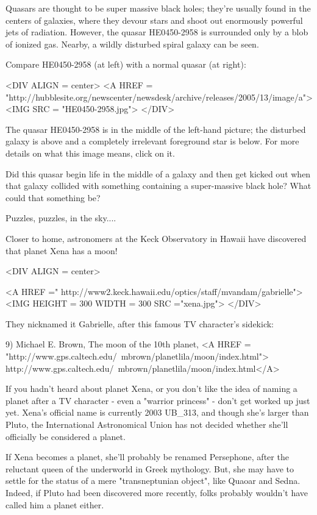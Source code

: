 Quasars are thought to be super massive black holes; they're usually 
found in the centers of galaxies, where they devour stars and shoot 
out enormously powerful jets of radiation.  However, the quasar 
HE0450-2958 is surrounded only by a blob of ionized gas.  Nearby, a
wildly disturbed spiral galaxy can be seen.  

Compare HE0450-2958 (at left) with a normal quasar (at right):

<DIV ALIGN = center>
<A HREF = "http://hubblesite.org/newscenter/newsdesk/archive/releases/2005/13/image/a">
<IMG SRC = 
"HE0450-2958.jpg">
</DIV>

The quasar HE0450-2958 is in the middle of the left-hand picture;
the disturbed galaxy is above and a completely irrelevant foreground
star is below.  For more details on what this image means, click on it.

Did this quasar begin 
life in the middle of a galaxy and then get kicked out when that 
galaxy collided 
with something containing a super-massive black hole?  What could that
something be?

Puzzles, puzzles, in the sky....

Closer to home, astronomers at the Keck Observatory in Hawaii have 
discovered that planet Xena has a moon! 

<DIV ALIGN = center>

<A HREF =" http://www2.keck.hawaii.edu/optics/staff/mvandam/gabrielle">
<IMG HEIGHT = 300 WIDTH = 300 SRC ="xena.jpg">
</DIV>

They nicknamed it Gabrielle, 
after this famous TV character's sidekick:

9) Michael E. Brown, The moon of the 10th planet, 
<A HREF = "http://www.gps.caltech.edu/~mbrown/planetlila/moon/index.html">
http://www.gps.caltech.edu/~mbrown/planetlila/moon/index.html</A>

If you hadn't heard about planet Xena, or you don't like the idea 
of naming a planet after a TV character - even a "warrior princess" - 
don't get worked up just yet.  Xena's official name is currently 
2003 UB_{313}, and though she's larger than Pluto, the International 
Astronomical Union has not decided whether she'll officially be 
considered a planet.  

If Xena becomes a planet, she'll probably be renamed Persephone, 
after the reluctant queen of the underworld in Greek mythology.  
But, she may have to settle for the status of a mere "transneptunian 
object", like Quaoar and Sedna.  Indeed, if Pluto had been discovered
more recently, folks probably wouldn't have called him a planet 
either.

